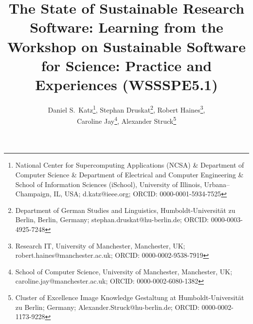 \documentclass[11pt,letterpaper]{article}
\begin{document}
\title{The State of Sustainable Research Software:
Learning from the Workshop on Sustainable Software for Science: Practice
and Experiences (WSSSPE5.1)}
\author{Daniel S.~Katz\thanks{National Center for Supercomputing Applications (NCSA) \& Department of Computer Science  \& Department of Electrical and Computer Engineering  \& School of Information Sciences (iSchool), University of Illinois, Urbana--Champaign, IL, USA; d.katz@ieee.org; ORCID: 0000-0001-5934-7525},
Stephan Druskat\thanks{Department of German Studies and Linguistics, Humboldt-Universität zu Berlin, Berlin, Germany; stephan.druskat@hu-berlin.de; ORCID: 0000-0003-4925-7248},
Robert Haines\thanks{Research IT, University of Manchester, Manchester, UK; robert.haines@manchester.ac.uk; ORCID: 0000-0002-9538-7919},\\
Caroline Jay\thanks{School of Computer Science, University of Manchester, Manchester, UK; caroline.jay@manchester.ac.uk; ORCID: 0000-0002-6080-1382},
Alexander Struck\thanks{Cluster of Excellence Image Knowledge Gestaltung at Humboldt-Universität zu Berlin; Germany; Alexander.Struck@hu-berlin.de; ORCID: 0000-0002-1173-9228}}

\maketitle
\end{document}
